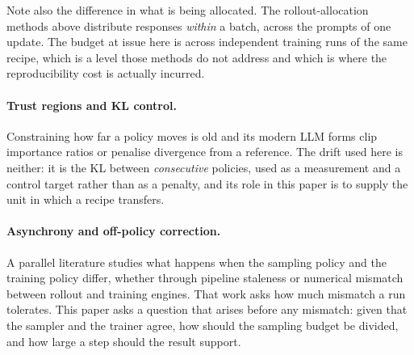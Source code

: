 Note also the difference in what is being allocated. The rollout-allocation methods above
distribute responses \emph{within} a batch, across the prompts of one update. The budget at issue
here is across independent training runs of the same recipe, which is a level those methods do not
address and which is where the reproducibility cost is actually incurred.

\paragraph{Trust regions and KL control.} Constraining how far a policy moves is old
\citep{schulman2015trpo, schulman2017ppo} and its modern LLM forms clip importance ratios or
penalise divergence from a reference. The drift used here is neither: it is the KL between
\emph{consecutive} policies, used as a measurement and a control target rather than as a penalty,
and its role in this paper is to supply the unit in which a recipe transfers.

\paragraph{Asynchrony and off-policy correction.} A parallel literature studies what happens when
the sampling policy and the training policy differ, whether through pipeline staleness
\citep{song2026staleness} or numerical mismatch between rollout and training engines. That work
asks how much mismatch a run tolerates. This paper asks a question that arises before any mismatch:
given that the sampler and the trainer agree, how should the sampling budget be divided, and how
large a step should the result support.
